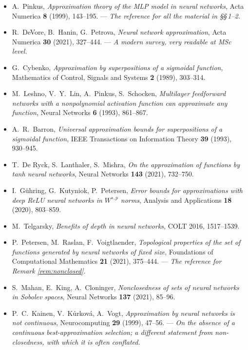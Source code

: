 \documentclass[11pt,a4paper]{article}
\begin{document}
\begin{itemize}[leftmargin=*, itemsep=4pt]
\item A.~Pinkus, \emph{Approximation theory of the MLP model in neural networks}, Acta Numerica
\textbf{8} (1999), 143--195. --- \emph{The reference for all the material in §§\,1--2.}
\item R.~DeVore, B.~Hanin, G.~Petrova, \emph{Neural network approximation}, Acta Numerica
\textbf{30} (2021), 327--444. --- \emph{A modern survey, very readable at MSc level.}
\item G.~Cybenko, \emph{Approximation by superpositions of a sigmoidal function}, Mathematics of
Control, Signals and Systems \textbf{2} (1989), 303--314.
\item M.~Leshno, V.~Y.~Lin, A.~Pinkus, S.~Schocken, \emph{Multilayer feedforward networks with a
nonpolynomial activation function can approximate any function}, Neural Networks \textbf{6} (1993),
861--867.
\item A.~R.~Barron, \emph{Universal approximation bounds for superpositions of a sigmoidal function},
IEEE Transactions on Information Theory \textbf{39} (1993), 930--945.
\item T.~De Ryck, S.~Lanthaler, S.~Mishra, \emph{On the approximation of functions by tanh neural
networks}, Neural Networks \textbf{143} (2021), 732--750.
\item I.~Gühring, G.~Kutyniok, P.~Petersen, \emph{Error bounds for approximations with deep ReLU
neural networks in $W^{s,p}$ norms}, Analysis and Applications \textbf{18} (2020), 803--859.
\item M.~Telgarsky, \emph{Benefits of depth in neural networks}, COLT 2016, 1517--1539.
\item P.~Petersen, M.~Raslan, F.~Voigtlaender, \emph{Topological properties of the set of functions
generated by neural networks of fixed size}, Foundations of Computational Mathematics \textbf{21}
(2021), 375--444. --- \emph{The reference for Remark \ref{rem:nonclosed}.}
\item S.~Mahan, E.~King, A.~Cloninger, \emph{Nonclosedness of sets of neural networks in Sobolev
spaces}, Neural Networks \textbf{137} (2021), 85--96.
\item P.~C.~Kainen, V.~K\r{u}rková, A.~Vogt, \emph{Approximation by neural networks is not
continuous}, Neurocomputing \textbf{29} (1999), 47--56. --- \emph{On the absence of a continuous
best-approximation selection; a different statement from non-closedness, with which it is often
conflated.}
\end{itemize}
\end{document}
